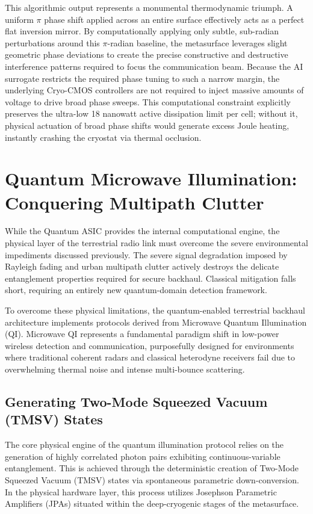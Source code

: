 \documentclass[11pt,a4paper]{article}
\begin{document}
This algorithmic output represents a monumental thermodynamic triumph.\cite{ref6} A uniform $\pi$ phase shift applied across an entire surface effectively acts as a perfect flat inversion mirror.\cite{ref6} By computationally applying only subtle, sub-radian perturbations around this $\pi$-radian baseline, the metasurface leverages slight geometric phase deviations to create the precise constructive and destructive interference patterns required to focus the communication beam.\cite{ref6} Because the AI surrogate restricts the required phase tuning to such a narrow margin, the underlying Cryo-CMOS controllers are not required to inject massive amounts of voltage to drive broad phase sweeps.\cite{ref6} This computational constraint explicitly preserves the ultra-low 18 nanowatt active dissipation limit per cell; without it, physical actuation of broad phase shifts would generate excess Joule heating, instantly crashing the cryostat via thermal occlusion.\cite{ref6}

\section{Quantum Microwave Illumination: Conquering Multipath Clutter}

While the Quantum ASIC provides the internal computational engine, the physical layer of the terrestrial radio link must overcome the severe environmental impediments discussed previously. The severe signal degradation imposed by Rayleigh fading and urban multipath clutter actively destroys the delicate entanglement properties required for secure backhaul.\cite{ref19} Classical mitigation falls short, requiring an entirely new quantum-domain detection framework.\cite{ref33}

To overcome these physical limitations, the quantum-enabled terrestrial backhaul architecture implements protocols derived from Microwave Quantum Illumination (QI).\cite{ref34} Microwave QI represents a fundamental paradigm shift in low-power wireless detection and communication, purposefully designed for environments where traditional coherent radars and classical heterodyne receivers fail due to overwhelming thermal noise and intense multi-bounce scattering.\cite{ref34}

\subsection{Generating Two-Mode Squeezed Vacuum (TMSV) States}

The core physical engine of the quantum illumination protocol relies on the generation of highly correlated photon pairs exhibiting continuous-variable entanglement. This is achieved through the deterministic creation of Two-Mode Squeezed Vacuum (TMSV) states via spontaneous parametric down-conversion.\cite{ref33} In the physical hardware layer, this process utilizes Josephson Parametric Amplifiers (JPAs) situated within the deep-cryogenic stages of the metasurface.\cite{ref34}
\end{document}
